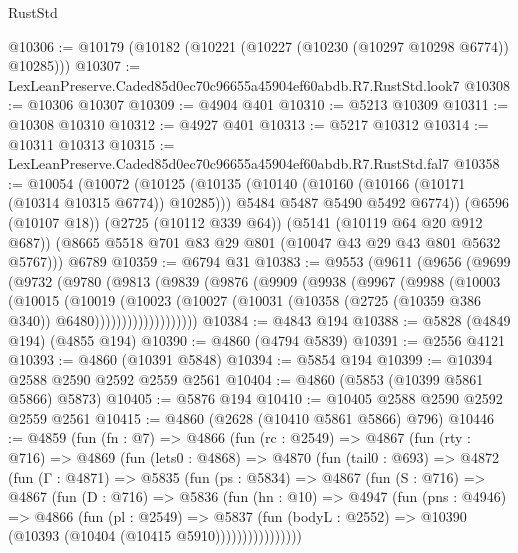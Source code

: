 \begin{lexlean}{RustStd}
\begin{coremodule}
@10306 := @10179 (@10182 (@10221 (@10227 (@10230 (@10297 @10298 @6774)) @10285)))
@10307 := LexLeanPreserve.Caded85d0ec70c96655a45904ef60abdb.R7.RustStd.look7
@10308 := @10306 @10307
@10309 := @4904 @401
@10310 := @5213 @10309
@10311 := @10308 @10310
@10312 := @4927 @401
@10313 := @5217 @10312
@10314 := @10311 @10313
@10315 := LexLeanPreserve.Caded85d0ec70c96655a45904ef60abdb.R7.RustStd.fal7
@10358 := @10054
    (@10072
      (@10125
        (@10135
          (@10140 (@10160 (@10166 (@10171 (@10314 @10315 @6774)) @10285)))
          @5484
          @5487
          @5490
          @5492
          @6774))
      (@6596 (@10107 @18))
      (@2725 (@10112 @339 @64))
      (@5141 (@10119 @64 @20 @912 @687))
      (@8665 @5518 @701 @83 @29 @801 (@10047 @43 @29 @43 @801 @5632 @5767)))
    @6789
@10359 := @6794 @31
@10383 := @9553
    (@9611
      (@9656
        (@9699
          (@9732
            (@9780
              (@9813
                (@9839
                  (@9876
                    (@9909
                      (@9938
                        (@9967
                          (@9988
                            (@10003
                              (@10015
                                (@10019
                                  (@10023
                                    (@10027
                                      (@10031
                                        (@10358 (@2725 (@10359 @386 @340)) @6480)))))))))))))))))))
@10384 := @4843 @194
@10388 := @5828 (@4849 @194) (@4855 @194)
@10390 := @4860 (@4794 @5839)
@10391 := @2556 @4121
@10393 := @4860 (@10391 @5848)
@10394 := @5854 @194
@10399 := @10394 @2588 @2590 @2592 @2559 @2561
@10404 := @4860 (@5853 (@10399 @5861 @5866) @5873)
@10405 := @5876 @194
@10410 := @10405 @2588 @2590 @2592 @2559 @2561
@10415 := @4860 (@2628 (@10410 @5861 @5866) @796)
@10446 := @4859
    (fun (fn : @7) =>
    @4866
      (fun (rc : @2549) =>
      @4867
        (fun (rty : @716) =>
        @4869
          (fun (lets0 : @4868) =>
          @4870
            (fun (tail0 : @693) =>
            @4872
              (fun (Γ : @4871) =>
              @5835
                (fun (ps : @5834) =>
                @4867
                  (fun (S : @716) =>
                  @4867
                    (fun (D : @716) =>
                    @5836
                      (fun (hn : @10) =>
                      @4947
                        (fun (pns : @4946) =>
                        @4866
                          (fun (pl : @2549) =>
                          @5837
                            (fun (bodyL : @2552) =>
                            @10390 (@10393 (@10404 (@10415 @5910))))))))))))))))

\end{coremodule}
\end{lexlean}
